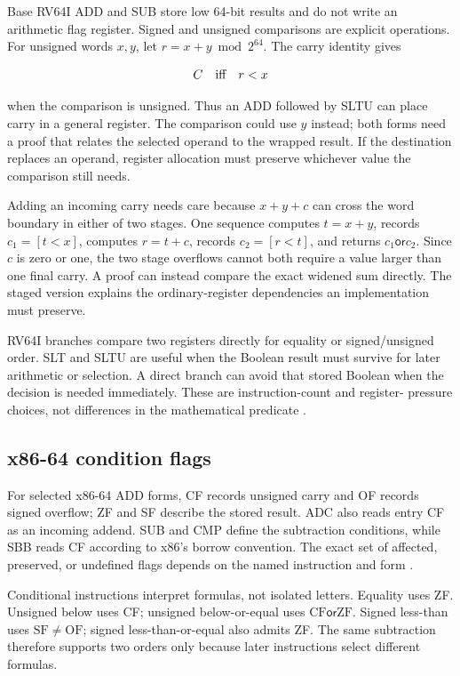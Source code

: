 Base RV64I ADD and SUB store low 64-bit results and do not write an arithmetic
flag register. Signed and unsigned comparisons are explicit operations. For
unsigned words \(x,y\), let \(r=x+y\bmod 2^{64}\). The carry identity gives

\[
  C\quad\hbox{iff}\quad r<x
\]

when the comparison is unsigned. Thus an ADD followed by SLTU can place carry
in a general register. The comparison could use \(y\) instead; both forms need
a proof that relates the selected operand to the wrapped result. If the
destination replaces an operand, register allocation must preserve whichever
value the comparison still needs.

Adding an incoming carry needs care because \(x+y+c\) can cross the word
boundary in either of two stages. One sequence computes \(t=x+y\), records
\(c_1=[t<x]\), computes \(r=t+c\), records \(c_2=[r<t]\), and returns
\(c_1\mathbin{\mathsf{or}}c_2\). Since \(c\) is zero or one, the two stage
overflows cannot both require a value larger than one final carry. A proof can
instead compare the exact widened sum directly. The staged version explains
the ordinary-register dependencies an implementation must preserve.

RV64I branches compare two registers directly for equality or signed/unsigned
order. SLT and SLTU are useful when the Boolean result must survive for later
arithmetic or selection. A direct branch can avoid that stored Boolean when the
decision is needed immediately. These are instruction-count and register-
pressure choices, not differences in the mathematical predicate
\autocite{riscv2026unpriv}.

\subsection{x86-64 condition flags}

For selected x86-64 ADD forms, CF records unsigned carry and OF records signed
overflow; ZF and SF describe the stored result. ADC also reads entry CF as an
incoming addend. SUB and CMP define the subtraction conditions, while SBB
reads CF according to x86's borrow convention. The exact set of affected,
preserved, or undefined flags depends on the named instruction and form
\autocite{intel2026sdm2}.

Conditional instructions interpret formulas, not isolated letters. Equality
uses ZF. Unsigned below uses CF; unsigned below-or-equal uses
\(\mathrm{CF}\mathbin{\mathsf{or}}\mathrm{ZF}\). Signed less-than uses
\(\mathrm{SF}\ne\mathrm{OF}\); signed less-than-or-equal also admits ZF. The
same subtraction therefore supports two orders only because later
instructions select different formulas.

